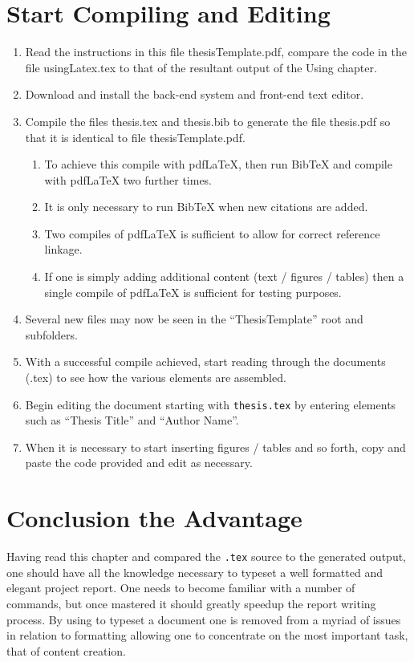 \section{Start Compiling and Editing}
{
\begin{enumerate}
\item Read the instructions in this file thesisTemplate.pdf, compare the code in the file usingLatex.tex to that of the resultant output of the Using \latex chapter. 

\item Download and install the back-end \latex system and front-end text editor. 

\item Compile the files thesis.tex and thesis.bib to generate the file thesis.pdf so that it is identical to file thesisTemplate.pdf.
\begin{enumerate}
\item To achieve this compile with pdfLaTeX, then run BibTeX and compile with pdfLaTeX two further times.

\item It is only necessary to run BibTeX when new citations are added.

\item Two compiles of pdfLaTeX is sufficient to allow for correct reference  linkage.

\item If one is simply adding additional content (text / figures / tables) then a single compile of pdfLaTeX is sufficient for testing purposes.
\end{enumerate}
\item Several new files may now be seen in the ``ThesisTemplate'' root and subfolders. 

\item With a successful compile achieved, start reading through the \latex documents (.tex) to see how the various elements are assembled.

\item Begin editing the document starting with {\tt thesis.tex} by entering elements such as ``Thesis Title'' and ``Author Name''.

\item When it is necessary to start inserting figures / tables and so forth, copy and paste the \latex code provided and edit as necessary.
\end{enumerate}
} %


\section{Conclusion  the \latex Advantage}
Having read this chapter and compared the {\tt .tex} source to the generated output, one should have all the knowledge necessary to typeset a well formatted and elegant project report. One needs to become familiar with a number of commands, but once mastered it should greatly speedup the report writing process. By using \latex to typeset a document one is removed from a myriad of issues in relation to formatting allowing one to concentrate on the most important task, that of content creation. 

